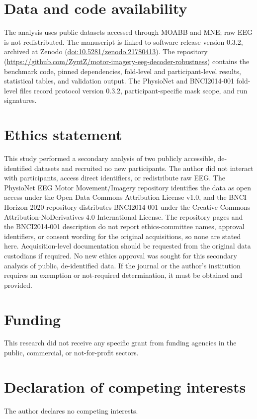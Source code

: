 \documentclass[11pt]{article}
\begin{document}
\section*{Data and code availability}
The analysis uses public datasets accessed through MOABB and MNE; raw EEG is not redistributed. The manuscript is linked to software release version 0.3.2, archived at Zenodo (\href{https://doi.org/10.5281/zenodo.21780413}{doi:10.5281/zenodo.21780413}). The repository (\url{https://github.com/ZyntZ/motor-imagery-eeg-decoder-robustness}) contains the benchmark code, pinned dependencies, fold-level and participant-level results, statistical tables, and validation output. The PhysioNet and BNCI2014-001 fold-level files record protocol version 0.3.2, participant-specific mask scope, and run signatures.

\section*{Ethics statement}
This study performed a secondary analysis of two publicly accessible, de-identified datasets and recruited no new participants. The author did not interact with participants, access direct identifiers, or redistribute raw EEG. The PhysioNet EEG Motor Movement/Imagery repository identifies the data as open access under the Open Data Commons Attribution License v1.0, and the BNCI Horizon 2020 repository distributes BNCI2014-001 under the Creative Commons Attribution-NoDerivatives 4.0 International License. The repository pages and the BNCI2014-001 description do not report ethics-committee names, approval identifiers, or consent wording for the original acquisitions, so none are stated here. Acquisition-level documentation should be requested from the original data custodians if required. No new ethics approval was sought for this secondary analysis of public, de-identified data. If the journal or the author's institution requires an exemption or not-required determination, it must be obtained and provided.

\section*{Funding}
This research did not receive any specific grant from funding agencies in the public, commercial, or not-for-profit sectors.

\section*{Declaration of competing interests}
The author declares no competing interests.
\end{document}
